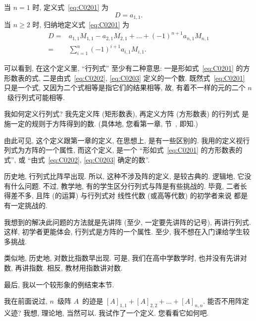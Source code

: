 \begin{definition}
    当 \(n = 1\) 时, 定义式~\eqref{eq:C0201} 为
    \begin{equation}
        D = a_{1,1}.
        \label{eq:C0202}
    \end{equation}
    当 \(n \geq 2\) 时, 归纳地定义式~\eqref{eq:C0201} 为
    \begin{equation}
        \begin{aligned}
            D
            = {} &
            a_{1,1} M_{1,1} - a_{2,1} M_{2,1} + \dots +
            (-1)^{n+1} a_{n,1} M_{n,1}
            \\
            = {} &
            \sum_{i = 1}^{n} {(-1)^{i+1} a_{i,1} M_{i,1}}.
        \end{aligned}
        \label{eq:C0203}
    \end{equation}
\end{definition}

可以看到, 在这个定义里,
``行列式'' 至少有二种意思:
一是形如式~\eqref{eq:C0201} 的方形数表的式,
二是由式~\eqref{eq:C0202}, \eqref{eq:C0203}
定义的一个数.
既然式~\eqref{eq:C0201} 只是一个式,
又因为二个式相等是指它们的结果相等,
故, 有着不一样的元的二个 \(n\)~级行列式可能相等.

我如何定义行列式?
我先定义阵 (矩形数表),
再定义方阵 (方形数表) 的行列式%
是施一定的规则于方阵得到的数.
(具体地, 您看第一章, 节~,  即知.)

由此可见, 这个定义跟第一章的定义,
在思想上, 是有一些区别的.
我用的定义视行列式为方阵的一个属性,
而这个定义,
是一个
``形如式~\eqref{eq:C0201} 的方形数表的式'',
或
``由式~\eqref{eq:C0202}, \eqref{eq:C0203} 确定的数''.

历史地, 行列式比阵早出现.
所以, 这种不涉及阵的定义, 是较古典的.
逻辑地, 它没有什么问题.
不过, 教学地, 有的学生区分行列式与阵是有些挑战的.
毕竟,
二者长得差不多,
且阵 (的运算) 与行列式对%
线性代数 (或高等代数) 的初学者来说%
都是有一定挑战的.

我想到的解决此问题的方法就是先讲阵
(至少, 一定要先讲阵的记号),
再讲行列式.
这样, 初学者更能体会,
行列式是方阵的一个属性.
至少, 我不想在入门课给学生较多挑战.

类似地, 历史地, 对数比指数早出现.
可是, 我们在高中学数学时,
也并没有先讲对数, 再讲指数.
相反, 教材用指数讲对数.

\vspace{2ex}

最后, 我以一个较形象的例结束本节.

我在前面说过,
\(n\)~级阵 \(A\)~的迹是
\([A]_{1,1} + [A]_{2,2} + \dots + [A]_{n,n}\).
能否不用阵定义迹?
我想, 理论地, 当然可以.
我试作了一个定义.
您看看它如何吧.

